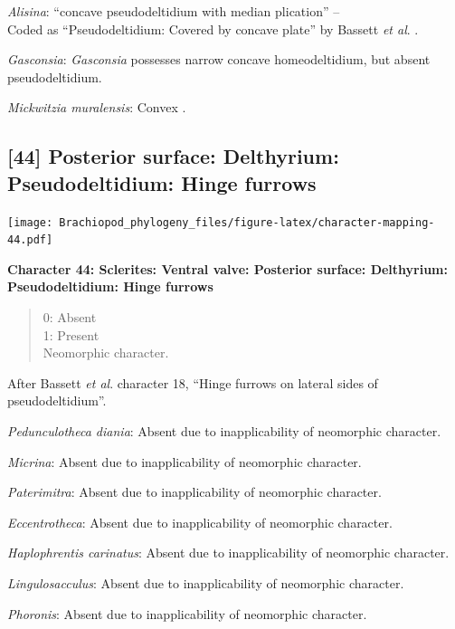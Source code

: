\documentclass[]{book}
\theoremstyle{definition}
\theoremstyle{definition}
\theoremstyle{definition}
\theoremstyle{remark}
\begin{document}
\emph{Alisina}: ``concave pseudodeltidium with median plication'' --
\citet{Williams2000BrachiopodaLinguliformea}\\
Coded as ``Pseudodeltidium: Covered by concave plate'' by Bassett
\emph{et al}. \citeyearpar{Bassett2001Functionalmorphology}.

\emph{Gasconsia}: \emph{Gasconsia} possesses narrow concave
homeodeltidium, but absent pseudodeltidium.

\emph{Mickwitzia muralensis}: Convex \citep[see][fig.
4B]{Balthasar2004Shellstructure}.

\hypertarget{posterior-surface-delthyrium-pseudodeltidium-hinge-furrows}{%
\subsection*{{[}44{]} Posterior surface: Delthyrium: Pseudodeltidium:
Hinge
furrows}\label{posterior-surface-delthyrium-pseudodeltidium-hinge-furrows}}

\texttt{[image: Brachiopod\_phylogeny\_files/figure-latex/character-mapping-44.pdf]}

\textbf{Character 44: Sclerites: Ventral valve: Posterior surface:
Delthyrium: Pseudodeltidium: Hinge furrows}

\begin{quote}
0: Absent\\
1: Present\\
Neomorphic character.
\end{quote}

After Bassett \emph{et al}.
\citeyearpar{Bassett2001Functionalmorphology} character 18, ``Hinge
furrows on lateral sides of pseudodeltidium''.

\emph{Pedunculotheca diania}: Absent due to inapplicability of
neomorphic character.

\emph{Micrina}: Absent due to inapplicability of neomorphic character.

\emph{Paterimitra}: Absent due to inapplicability of neomorphic
character.

\emph{Eccentrotheca}: Absent due to inapplicability of neomorphic
character.

\emph{Haplophrentis carinatus}: Absent due to inapplicability of
neomorphic character.

\emph{Lingulosacculus}: Absent due to inapplicability of neomorphic
character.

\emph{Phoronis}: Absent due to inapplicability of neomorphic character.
\end{document}
